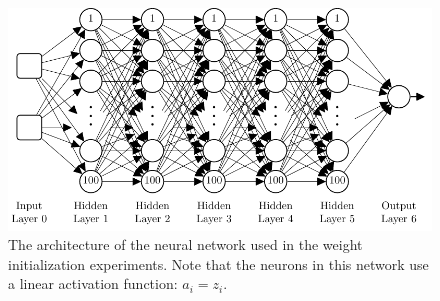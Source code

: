 \documentclass[xcolor={table}]{beamer}
\begin{document}
 \begin{frame} 
\begin{figure}
\includegraphics[width=\textwidth]{./images/fmlpda_8_22.pdf}
\caption{The architecture of the neural network used in the weight initialization experiments. Note that the neurons in this network use a linear activation function: $a_i=z_i$.}
\label{fig:weightinitarch}
\end{figure}
\end{frame} 
\end{document}
